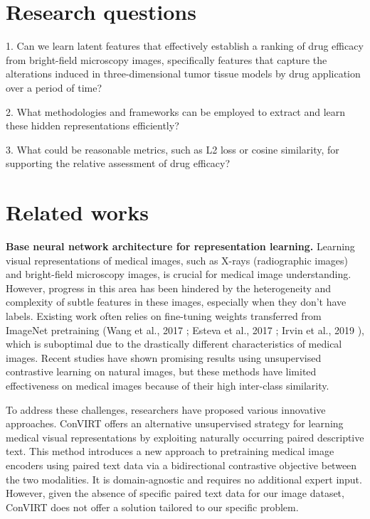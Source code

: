 \documentclass[12pt,twoside,a4paper,parskip]{scrbook} %
\begin{document}
\chapter{Research questions}\label{ch:Research questions}

1. Can we learn latent features that effectively establish a ranking of drug efficacy from bright-field microscopy images, specifically features that capture the alterations induced in three-dimensional tumor tissue models by drug application over a period of time?

2. What methodologies and frameworks can be employed to extract and learn these hidden representations efficiently?

3. What could be reasonable metrics, such as L2 loss or cosine similarity, for supporting the relative assessment of drug efficacy?

\chapter{Related works}\label{ch:Related works}
\textbf{Base neural network architecture for representation learning.} Learning visual representations of medical images, such as X-rays (radiographic images) and bright-field microscopy images, is crucial for medical image understanding. However, progress in this area has been hindered by the heterogeneity and complexity of subtle features in these images, especially when they don't have labels. Existing work often relies on fine-tuning weights transferred from ImageNet pretraining (Wang et al., 2017 \cite{8099852} ; Esteva et al., 2017 \cite{Esteva2017Dermatologist} ; Irvin et al., 2019 \cite{irvin2019chexpert} ), which is suboptimal due to the drastically different characteristics of medical images. Recent studies have shown promising results using unsupervised contrastive learning on natural images, but these methods have limited effectiveness on medical images because of their high inter-class similarity.

To address these challenges, researchers have proposed various innovative approaches. ConVIRT \cite{zhang2022contrastive} offers an alternative unsupervised strategy for learning medical visual representations by exploiting naturally occurring paired descriptive text. This method introduces a new approach to pretraining medical image encoders using paired text data via a bidirectional contrastive objective between the two modalities. It is domain-agnostic and requires no additional expert input.  However, given the absence of specific paired text data for our image dataset, ConVIRT does not offer a solution tailored to our specific problem.
\end{document}

